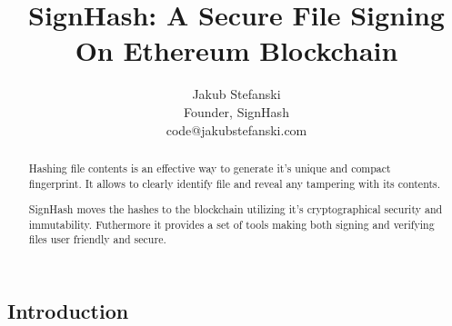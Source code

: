 \documentclass[9pt,oneside]{amsart}
\title{SignHash: A Secure File Signing On Ethereum Blockchain}
\author{
	Jakub Stefanski\\
	Founder, SignHash\\
	code@jakubstefanski.com
}
\begin{document}
\begin{abstract}

Hashing file contents is an effective way to generate it's unique and compact fingerprint.
It allows to clearly identify file and reveal any tampering with its contents.

SignHash moves the hashes to the blockchain utilizing it's cryptographical security and immutability.
Futhermore it provides a set of tools making both signing and verifying files user friendly and secure.

\end{abstract}

\maketitle

\setlength{\columnsep}{20pt}
\begin{multicols}{2}

\section{Introduction}

\end{multicols}
\end{document}
